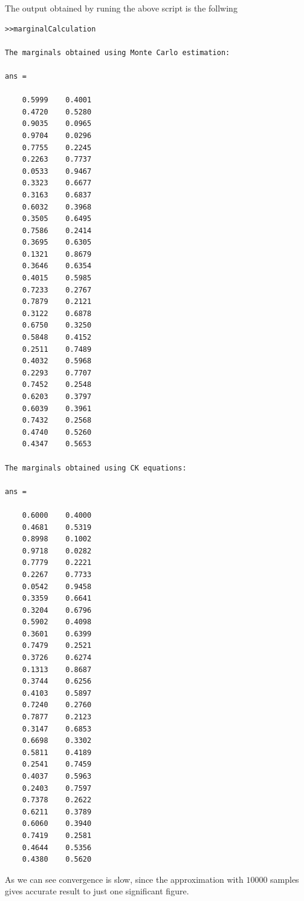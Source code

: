 \documentclass{article}
\begin{document}
The output obtained by runing the above script is the follwing
\begin{verbatim}
>>marginalCalculation

The marginals obtained using Monte Carlo estimation: 

ans =

    0.5999    0.4001
    0.4720    0.5280
    0.9035    0.0965
    0.9704    0.0296
    0.7755    0.2245
    0.2263    0.7737
    0.0533    0.9467
    0.3323    0.6677
    0.3163    0.6837
    0.6032    0.3968
    0.3505    0.6495
    0.7586    0.2414
    0.3695    0.6305
    0.1321    0.8679
    0.3646    0.6354
    0.4015    0.5985
    0.7233    0.2767
    0.7879    0.2121
    0.3122    0.6878
    0.6750    0.3250
    0.5848    0.4152
    0.2511    0.7489
    0.4032    0.5968
    0.2293    0.7707
    0.7452    0.2548
    0.6203    0.3797
    0.6039    0.3961
    0.7432    0.2568
    0.4740    0.5260
    0.4347    0.5653

The marginals obtained using CK equations: 

ans =

    0.6000    0.4000
    0.4681    0.5319
    0.8998    0.1002
    0.9718    0.0282
    0.7779    0.2221
    0.2267    0.7733
    0.0542    0.9458
    0.3359    0.6641
    0.3204    0.6796
    0.5902    0.4098
    0.3601    0.6399
    0.7479    0.2521
    0.3726    0.6274
    0.1313    0.8687
    0.3744    0.6256
    0.4103    0.5897
    0.7240    0.2760
    0.7877    0.2123
    0.3147    0.6853
    0.6698    0.3302
    0.5811    0.4189
    0.2541    0.7459
    0.4037    0.5963
    0.2403    0.7597
    0.7378    0.2622
    0.6211    0.3789
    0.6060    0.3940
    0.7419    0.2581
    0.4644    0.5356
    0.4380    0.5620
\end{verbatim}
As we can see convergence is slow, since the approximation with $10000$ samples gives accurate result to just one significant figure.
\newline
\end{document}
